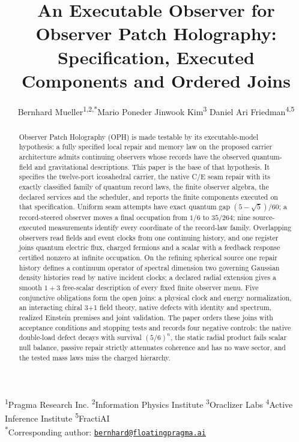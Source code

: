 \documentclass[11pt]{article}
\title{An Executable Observer for Observer Patch Holography:\\
Specification, Executed Components and Ordered Joins}
\author{Bernhard Mueller\textsuperscript{1,2,*}\qquad Mario Poneder\qquad
Jinwook Kim\textsuperscript{3}\qquad
Daniel Ari Friedman\textsuperscript{4,5}}
\date{\OPHPaperReleaseDate}
\theoremstyle{definition}
\theoremstyle{remark}
\theoremstyle{plain}
\begin{document}
\maketitle
\OPHPaperReleaseBanner

\begin{center}
\footnotesize
\textsuperscript{1}Pragma Research Inc.\quad
\textsuperscript{2}Information Physics Institute\quad
\textsuperscript{3}Oraclizer Labs\quad
\textsuperscript{4}Active Inference Institute\quad
\textsuperscript{5}FractiAI\\
\textsuperscript{*}Corresponding author:
\href{mailto:bernhard@floatingpragma.ai}{\nolinkurl{bernhard@floatingpragma.ai}}
\end{center}

\begin{abstract}
Observer Patch Holography (OPH) is made testable by its executable-model
hypothesis: a fully specified local repair and memory law on the proposed
carrier architecture admits continuing observers whose records have the
observed quantum-field and gravitational descriptions. This paper is the base
of that hypothesis. It specifies the twelve-port icosahedral carrier, the
native C/E seam repair with its exactly classified family of quantum record
laws, the finite observer algebra, the declared services and the scheduler,
and reports the finite components executed on that specification. Uniform
seam attempts have exact quantum gap $(5-\sqrt5)/60$; a record-steered
observer moves a final occupation from $1/6$ to $35/264$; nine
source-executed measurements identify every coordinate of the record-law
family. Overlapping observers read fields and event clocks from one
continuing history, and one register joins quantum electric flux, charged
fermions and a scalar with a feedback response certified nonzero at infinite
occupation. On the refining spherical source one repair history defines a
continuum operator of spectral dimension two governing Gaussian density
histories read by native incident clocks; a declared radial extension gives
a smooth $1+3$ free-scalar description of every fixed finite observer menu.
Five conjunctive obligations form the open joins: a physical clock and energy
normalization, an interacting chiral 3+1 field theory, native defects with
identity and spectrum, realized Einstein premises and joint validation. The
paper orders these joins with acceptance conditions and stopping tests and
records four negative controls: the native double-load defect decays with
survival $(5/6)^n$, the static radial product fails scalar null balance,
passive repair strictly attenuates coherence and has no wave sector, and the
tested mass laws miss the charged hierarchy.
\end{abstract}
\end{document}
